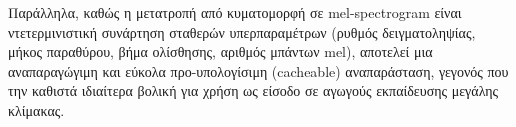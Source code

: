 Παράλληλα, καθώς η μετατροπή από κυματομορφή σε mel-spectrogram είναι ντετερμινιστική συνάρτηση σταθερών υπερπαραμέτρων (ρυθμός δειγματοληψίας, μήκος παραθύρου, βήμα ολίσθησης, αριθμός μπάντων mel), αποτελεί μια αναπαραγώγιμη και εύκολα προ-υπολογίσιμη (cacheable) αναπαράσταση, γεγονός που την καθιστά ιδιαίτερα βολική για χρήση ως είσοδο σε αγωγούς εκπαίδευσης μεγάλης κλίμακας.